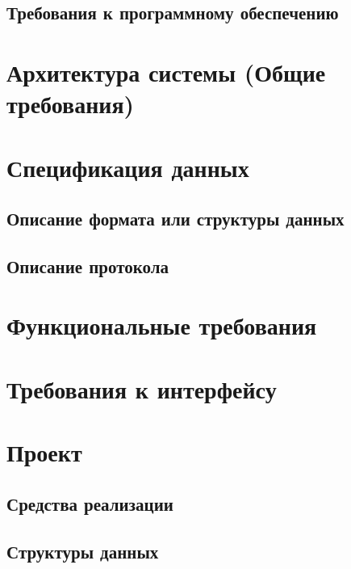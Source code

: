 \documentclass{fefu}
\begin{document}
  \subsection{Требования к программному обеспечению}
  

  \section{Архитектура системы (Общие требования)}
  

  \section{Спецификация данных}
  \subsection{Описание формата или структуры данных}
  
  \subsection{Описание протокола}
  

  \section{Функциональные требования}
  

  \section{Требования к интерфейсу}
  

  \section{Проект}
  \subsection{Средства реализации}
  
  \subsection{Структуры данных}
  

  \newpage
  \nocite{*} %
  
  
\end{document}
